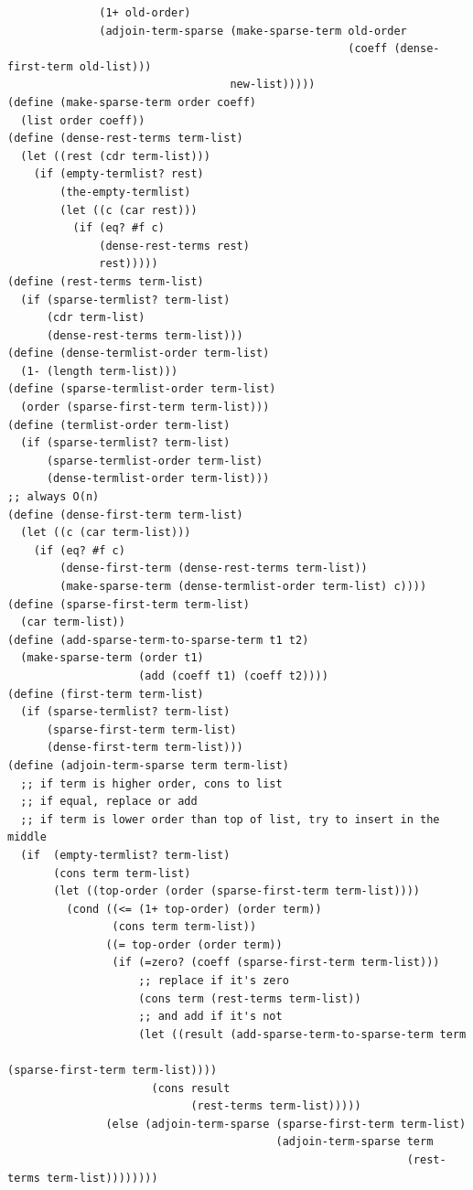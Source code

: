 \documentclass[final,fleqn,titlepage,twoside]{article}
\begin{document}
\begin{verbatim}
              (1+ old-order)
              (adjoin-term-sparse (make-sparse-term old-order
                                                    (coeff (dense-first-term old-list)))
                                  new-list)))))
(define (make-sparse-term order coeff)
  (list order coeff))
(define (dense-rest-terms term-list)
  (let ((rest (cdr term-list)))
    (if (empty-termlist? rest)
        (the-empty-termlist)
        (let ((c (car rest)))
          (if (eq? #f c)
              (dense-rest-terms rest)
              rest)))))
(define (rest-terms term-list)
  (if (sparse-termlist? term-list)
      (cdr term-list)
      (dense-rest-terms term-list)))
(define (dense-termlist-order term-list)
  (1- (length term-list)))
(define (sparse-termlist-order term-list)
  (order (sparse-first-term term-list)))
(define (termlist-order term-list)
  (if (sparse-termlist? term-list)
      (sparse-termlist-order term-list)
      (dense-termlist-order term-list)))
;; always O(n)
(define (dense-first-term term-list)
  (let ((c (car term-list)))
    (if (eq? #f c)
        (dense-first-term (dense-rest-terms term-list))
        (make-sparse-term (dense-termlist-order term-list) c))))
(define (sparse-first-term term-list)
  (car term-list))
(define (add-sparse-term-to-sparse-term t1 t2)
  (make-sparse-term (order t1)
                    (add (coeff t1) (coeff t2))))
(define (first-term term-list)
  (if (sparse-termlist? term-list)
      (sparse-first-term term-list)
      (dense-first-term term-list)))
(define (adjoin-term-sparse term term-list)
  ;; if term is higher order, cons to list
  ;; if equal, replace or add
  ;; if term is lower order than top of list, try to insert in the middle
  (if  (empty-termlist? term-list)
       (cons term term-list)
       (let ((top-order (order (sparse-first-term term-list))))
         (cond ((<= (1+ top-order) (order term))
                (cons term term-list))
               ((= top-order (order term))
                (if (=zero? (coeff (sparse-first-term term-list)))
                    ;; replace if it's zero
                    (cons term (rest-terms term-list))
                    ;; and add if it's not
                    (let ((result (add-sparse-term-to-sparse-term term
                                                                  (sparse-first-term term-list))))
                      (cons result
                            (rest-terms term-list))))) 
               (else (adjoin-term-sparse (sparse-first-term term-list)
                                         (adjoin-term-sparse term
                                                             (rest-terms term-list))))))))

\end{verbatim}
\end{document}

